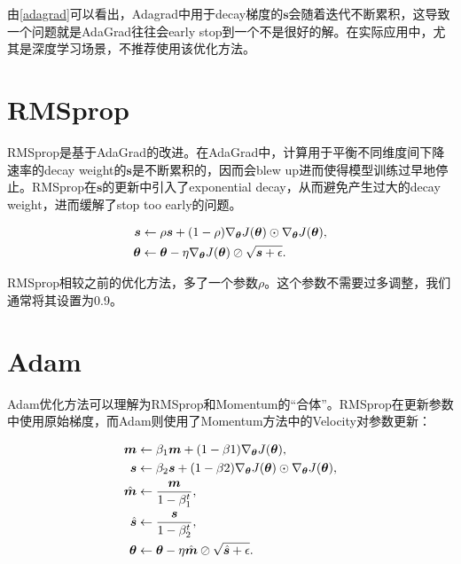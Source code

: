 \documentclass[lang=cn,newtx,10pt,scheme=chinese,color=black]{elegantbook}
\begin{document}
由\ref{adagrad}可以看出，Adagrad中用于decay梯度的$\bm{s}$会随着迭代不断累积，这导致一个问题就是AdaGrad往往会early stop到一个不是很好的解。在实际应用中，尤其是深度学习场景，不推荐使用该优化方法。

\section{RMSprop}

RMSprop是基于AdaGrad的改进。在AdaGrad中，计算用于平衡不同维度间下降速率的decay weight的$\bm{s}$是不断累积的，因而会blew up进而使得模型训练过早地停止。RMSprop在$\bm{s}$的更新中引入了exponential decay，从而避免产生过大的decay weight，进而缓解了stop too early的问题。

\begin{align}
  \label{rmsprop}
  \bm{s} &\leftarrow \rho\bm{s} + (1-\rho) \nabla_{\bm{\theta}}{J(\bm{\theta})} \odot \nabla_{\bm{\theta}}{J(\bm{\theta})},\\
  \bm{\theta} &\leftarrow \bm{\theta} - \eta\nabla_{\bm{\theta}}{J(\bm{\theta})} \oslash \sqrt{\bm{s} + \epsilon} . \notag
\end{align}

RMSprop相较之前的优化方法，多了一个参数$\rho$。这个参数不需要过多调整，我们通常将其设置为0.9。

\section{Adam}

Adam优化方法可以理解为RMSprop和Momentum的“合体”。RMSprop在更新参数中使用原始梯度，而Adam则使用了Momentum方法中的Velocity对参数更新：

\begin{align}
  \label{adam}
  \bm{m} &\leftarrow \beta_1\bm{m} + (1 - \beta1) \nabla_{\bm{\theta}}{J(\bm{\theta})},\\
  \bm{s} &\leftarrow \beta_2\bm{s} + (1 - \beta2) \nabla_{\bm{\theta}}{J(\bm{\theta})} \odot \nabla_{\bm{\theta}}{J(\bm{\theta})}, \notag \\
  \hat{\bm{m}} &\leftarrow \frac{\bm{m}}{1 - \beta_1^t}, \notag\\
  \hat{\bm{s}} &\leftarrow \frac{\bm{s}}{1 - \beta_2^t}, \notag\\
  \bm{\theta} &\leftarrow \bm{\theta} - \eta\hat{\bm{m}} \oslash \sqrt{\hat{\bm{s}} + \epsilon} . \notag
\end{align}
\end{document}
